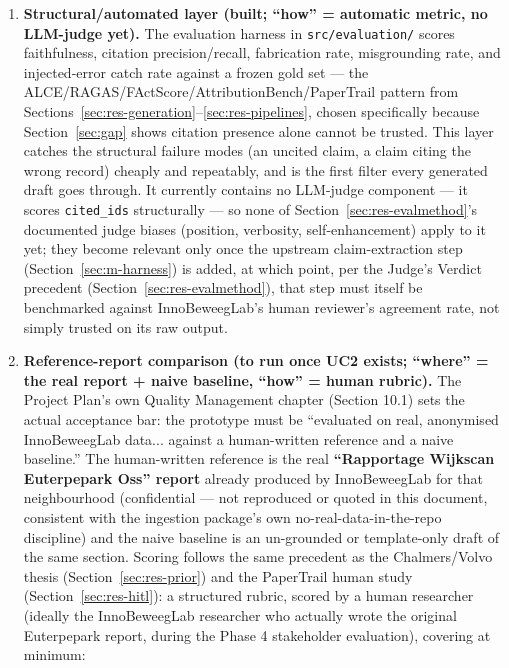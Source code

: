 \begin{enumerate}
\item \textbf{Structural/automated layer (built; \textquotedblleft{}how\textquotedblright{} = automatic metric, no LLM-judge yet).} The evaluation harness in \texttt{src/evaluation/} scores faithfulness, citation precision/recall, fabrication rate, misgrounding rate, and injected-error catch rate against a frozen gold set — the ALCE/RAGAS/FActScore/AttributionBench/PaperTrail pattern from Sections~\ref{sec:res-generation}--\ref{sec:res-pipelines}, chosen specifically because Section~\ref{sec:gap} shows citation presence alone cannot be trusted. This layer catches the structural failure modes (an uncited claim, a claim citing the wrong record) cheaply and repeatably, and is the first filter every generated draft goes through. It currently contains no LLM-judge component — it scores \texttt{cited\_ids} structurally — so none of Section~\ref{sec:res-evalmethod}'s documented judge biases (position, verbosity, self-enhancement) apply to it yet; they become relevant only once the upstream claim-extraction step (Section~\ref{sec:m-harness}) is added, at which point, per the Judge's Verdict precedent (Section~\ref{sec:res-evalmethod}), that step must itself be benchmarked against InnoBeweegLab's human reviewer's agreement rate, not simply trusted on its raw output.
\item \textbf{Reference-report comparison (to run once UC2 exists; \textquotedblleft{}where\textquotedblright{} = the real report + naive baseline, \textquotedblleft{}how\textquotedblright{} = human rubric).} The Project Plan's own Quality Management chapter (Section 10.1) sets the actual acceptance bar: the prototype must be \textquotedblleft{}evaluated on real, anonymised InnoBeweegLab data... against a human-written reference and a naive baseline.\textquotedblright{} The human-written reference is the real \textbf{\textquotedblleft{}Rapportage Wijkscan Euterpepark Oss\textquotedblright{} report} already produced by InnoBeweegLab for that neighbourhood (confidential — not reproduced or quoted in this document, consistent with the ingestion package's own no-real-data-in-the-repo discipline) and the naive baseline is an un-grounded or template-only draft of the same section. Scoring follows the same precedent as the Chalmers/Volvo thesis (Section~\ref{sec:res-prior}) and the PaperTrail human study (Section~\ref{sec:res-hitl}): a structured rubric, scored by a human researcher (ideally the InnoBeweegLab researcher who actually wrote the original Euterpepark report, during the Phase 4 stakeholder evaluation), covering at minimum:

\end{enumerate}
